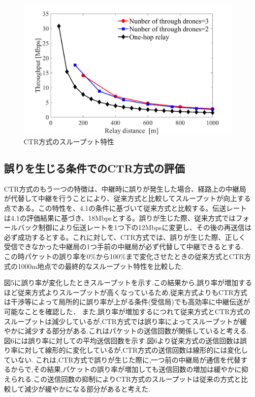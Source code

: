 \documentclass[a4paper,10pt]{ltjsarticle}
\begin{document}
\begin{figure}[H]
  \centering
  \includegraphics[width=\linewidth]{throughtput_vs_placement_50m_max_distance_3.pdf} %
  \caption{CTR方式のスループット特性}
  \label{fig:throughput_through} %
\end{figure}

\subsection{誤りを生じる条件でのCTR方式の評価}
CTR方式のもう一つの特徴は、中継時に誤りが発生した場合、経路上の中継局が代替して中継を行うことにより、従来方式と比較してスループットが向上する点である。この特性を、4.1の条件に基づいて従来方式と比較する。伝送レートは4.1の評価結果に基づき、18Mbpsとする。誤りが生じた際、従来方式ではフォールバック制御により伝送レートを1つ下の12Mbpsに変更し、その後の再送信は必ず成功するとする。これに対して、CTR方式では、誤りが生じた際、正しく受信できなかった中継局の1つ手前の中継局が必ず代替して中継できるとする.
この時パケットの誤り率を0\%から100\%まで変化させたときの従来方式とCTR方式の1000m地点での最終的なスループット特性を比較した.

図5に誤り率が変化したときスループットを示す.この結果から,誤り率が増加するほど従来方式よりスループットが高くなっているため,従来方式よりもCTR方式は干渉等によって局所的に誤り率が上がる条件(受信局)でも高効率に中継伝送が可能なことを確認した．
また,誤り率が増加するにつれて従来方式とCTR方式のスループットは減少しているが,CTR方式では誤り率によってスループットが緩やかに減少する部分がある.これはパケットの送信回数が関係していると考える.図6には誤り率に対しての平均送信回数を示す.図6より従来方式の送信回数は誤り率に対して線形的に変化しているが,CTR方式の送信回数は線形的には変化していない.
これは,CTR方式で誤りが生じた際に,一つ前の中継局が通信を代替するからで,その結果,パケットの誤り率が増加しても送信回数の増加は緩やかに抑えられる.この送信回数の抑制によりCTR方式のスループットは従来の方式と比較して減少が緩やかになる部分があると考えた.
\end{document}
